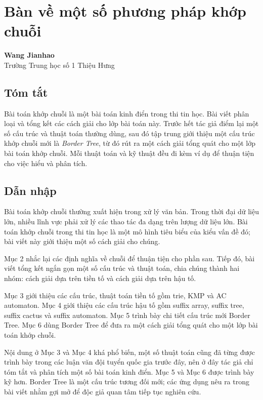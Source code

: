 \documentclass[11pt]{article}
\begin{document}
\section{Bàn về một số phương pháp khớp chuỗi}

\begin{center}
\textbf{Wang Jianhao}\\
Trường Trung học số 1 Thiệu Hưng
\end{center}

\subsection*{Tóm tắt}

Bài toán khớp chuỗi là một bài toán kinh điển trong thi tin học. Bài viết phân
loại và tổng kết các cách giải cho lớp bài toán này. Trước hết tác giả điểm lại
một số cấu trúc và thuật toán thường dùng, sau đó tập trung giới thiệu một cấu
trúc khớp chuỗi mới là \emph{Border Tree}, từ đó rút ra một cách giải tổng quát
cho một lớp bài toán khớp chuỗi. Mỗi thuật toán và kỹ thuật đều đi kèm ví dụ để
thuận tiện cho việc hiểu và phân tích.

\subsection{Dẫn nhập}

Bài toán khớp chuỗi thường xuất hiện trong xử lý văn bản. Trong thời đại dữ liệu
lớn, nhiều lĩnh vực phải xử lý các thao tác đa dạng trên lượng dữ liệu lớn. Bài
toán khớp chuỗi trong thi tin học là một mô hình tiêu biểu của kiểu vấn đề đó;
bài viết này giới thiệu một số cách giải cho chúng.

Mục 2 nhắc lại các định nghĩa về chuỗi để thuận tiện cho phần sau. Tiếp đó, bài
viết tổng kết ngắn gọn một số cấu trúc và thuật toán, chia chúng thành hai nhóm:
cách giải dựa trên tiền tố và cách giải dựa trên hậu tố.

Mục 3 giới thiệu các cấu trúc, thuật toán tiền tố gồm trie, KMP và AC automaton.
Mục 4 giới thiệu các cấu trúc hậu tố gồm suffix array, suffix tree, suffix
cactus và suffix automaton. Mục 5 trình bày chi tiết cấu trúc mới Border Tree.
Mục 6 dùng Border Tree để đưa ra một cách giải tổng quát cho một lớp bài toán
khớp chuỗi.

Nội dung ở Mục 3 và Mục 4 khá phổ biến, một số thuật toán cũng đã từng được
trình bày trong các luận văn đội tuyển quốc gia trước đây, nên ở đây tác giả
chỉ tóm tắt và phân tích một số bài toán kinh điển. Mục 5 và Mục 6 được trình
bày kỹ hơn. Border Tree là một cấu trúc tương đối mới; các ứng dụng nêu ra
trong bài viết nhằm gợi mở để độc giả quan tâm tiếp tục nghiên cứu.
\end{document}
